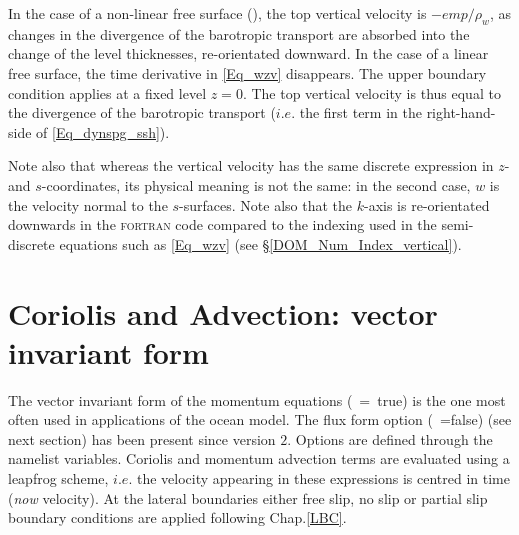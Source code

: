 \documentclass[NEMO_book]{subfiles}
\begin{document}
In the case of a non-linear free surface (), the top vertical velocity is $-\textit{emp}/\rho_w$, 
as changes in the divergence of the barotropic transport are absorbed into the change 
of the level thicknesses, re-orientated downward.
In the case of a linear free surface, the time derivative in \eqref{Eq_wzv} disappears.
The upper boundary condition applies at a fixed level $z=0$. The top vertical velocity 
is thus equal to the divergence of the barotropic transport ($i.e.$ the first term in the
right-hand-side of \eqref{Eq_dynspg_ssh}).

Note also that whereas the vertical velocity has the same discrete 
expression in $z$- and $s$-coordinates, its physical meaning is not the same: 
in the second case, $w$ is the velocity normal to the $s$-surfaces. 
Note also that the $k$-axis is re-orientated downwards in the \textsc{fortran} code compared 
to the indexing used in the semi-discrete equations such as \eqref{Eq_wzv} 
(see  \S\ref{DOM_Num_Index_vertical}). 


\section{Coriolis and Advection: vector invariant form}
\label{DYN_adv_cor_vect}

The vector invariant form of the momentum equations (~=~true) is the one most 
often used in applications of the \NEMO ocean model. The flux form option (~=false)
(see next section) has been present since version $2$. 
Options are defined through the  namelist variables.
Coriolis and momentum advection terms are evaluated using a leapfrog scheme, 
$i.e.$ the velocity appearing in these expressions is centred in time (\textit{now} velocity). 
At the lateral boundaries either free slip, no slip or partial slip boundary 
conditions are applied following Chap.\ref{LBC}.

\end{document}
